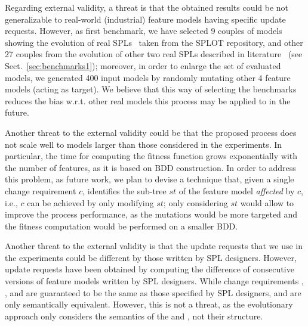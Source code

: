 \begin{tikzborder}{\cite{Gargantini16:validation}}
\begin{tikzborder}{\cite{gargantini_combinatorial_2017}}
\begin{tikzborder}{\cite{gargantini_combinatorial_2017}}
\begin{tikzborder}{\cite{garn2019}}
\begin{tikzborder}{\cite{arcaini2019achieving}}
	\bb Regarding external validity, a threat is that the obtained results could be not generalizable to real-world (industrial) feature models having specific update requests. However, as first benchmark, we have selected 9 couples of models showing the evolution of real SPLs~\cite{multimediaPaper,helpSystemPaper,smartHomePaper} taken from the SPLOT repository, and other 27 couples from the evolution of other two real SPLs described in literature~\cite{Burdek2016,Pleuss2012} (see Sect.~\ref{sec:benchmarks1}); moreover, in order to enlarge the set of evaluated models, we generated 400 input models by randomly mutating other 4 feature models (acting as target). We believe that this way of selecting the benchmarks reduces the bias w.r.t. other real models this process may be applied to in the future.
	
	Another threat to the external validity could be that the proposed process does not scale well to models larger than those considered in the experiments. In particular, the time for computing the fitness function grows exponentially with the number of features, as it is based on BDD construction. In order to address this problem, as future work, we plan to devise a technique that, given a single change requirement $c$, identifies the sub-tree $\mathit{st}$ of the feature model {\it affected} by $c$, i.e., $c$ can be achieved by only modifying $\mathit{st}$; only considering $\mathit{st}$ would allow to improve the process performance, as the mutations would be more targeted and the fitness computation would be performed on a smaller BDD.
	
	Another threat to the external validity is that the update requests that we use in the experiments could be different by those written by SPL designers. However, update requests have been obtained by computing the difference of consecutive versions of feature models written by SPL designers. While change requirements \Ftbr, \Fadd, and \Frem are guaranteed to be the same as those specified by SPL designers, \CFrelax and \CFrem are only semantically equivalent. However, this is not a threat, as the evolutionary approach only considers the semantics of the \CFrelax and \CFrem, not their structure.\be
	

\end{tikzborder}
\end{tikzborder}
\end{tikzborder}
\end{tikzborder}
\end{tikzborder}
